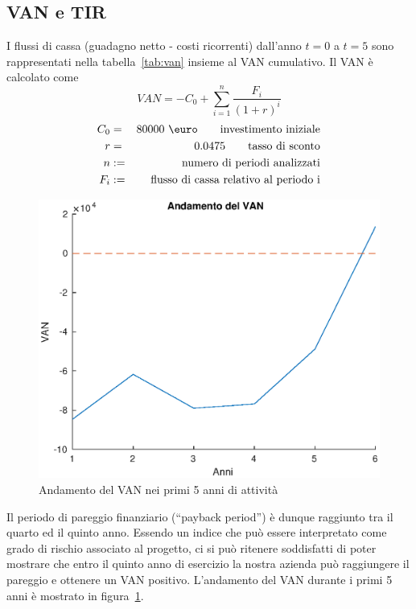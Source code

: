 \subsection{VAN e TIR}
I flussi di cassa (guadagno netto - costi ricorrenti) dall’anno $t=0$ a $t=5$
sono rappresentati nella tabella~\ref{tab:van} insieme al VAN cumulativo.
Il VAN è calcolato come
\begin{displaymath}
VAN = - C_0 + \sum_{i=1}^n \frac{F_i}{(1 + r)^i}
\end{displaymath}
\begin{eqnarray*}
C_0 &=& 80000 \ \mbox{\euro} \qquad \mbox{investimento iniziale} \\
r &=& 0.0475 \qquad \mbox{tasso di sconto} \\
n &:=& \mbox{numero di periodi analizzati} \\
F_i &:=& \mbox{flusso di cassa relativo al periodo i}
\end{eqnarray*}

%
\begin{figure}[!h]
\centering
\includegraphics[width=\textwidth]{figures/van}
\caption{Andamento del VAN nei primi 5 anni di attività}
\label{van}
\end{figure}
%
Il periodo di pareggio finanziario (“payback period”) è dunque raggiunto tra il
quarto ed il quinto anno. Essendo un indice che può essere interpretato come
grado di rischio associato al progetto, ci si può ritenere soddisfatti di poter
mostrare che entro il quinto anno di esercizio la nostra azienda può raggiungere
il pareggio e ottenere un VAN positivo. L'andamento del VAN durante i primi 5
anni è mostrato in figura~\ref{van}.

